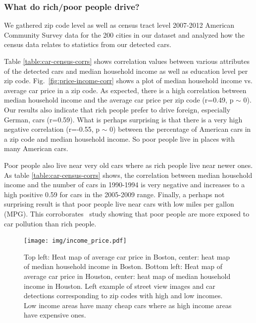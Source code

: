 \documentclass[10pt,twocolumn,letterpaper]{article}
\begin{document}
\subsubsection{What do rich/poor people drive?}
We gathered zip code level as well as census tract level 2007-2012 American Community Survey data for the 200 cities in our dataset and analyzed how the census data relates to statistics from our detected cars. 

Table \ref{table:car-census-corrs} shows correlation values between various attributes of the detected cars and median household income as well as education level per zip code. Fig.~\ref{fig:price-income-corr} shows a plot of median household income vs. average car price in a zip code. As expected, there is a high correlation between median household income and the average car price per zip code (r=0.49, p \(\sim\) 0). Our results also indicate that rich people prefer to drive foreign, especially German, cars (r=0.59). What is perhaps surprising is that there is a very high negative correlation (r=-0.55, p \(\sim\) 0) between the percentage of American cars in a zip code and median household income. So poor people live in places with many American cars.

Poor people also live near very old cars where as rich people live near newer ones. As table \ref{table:car-census-corrs} shows, the correlation between median household income and the number of cars in 1990-1994 is very negative and increases to a high positive 0.59 for cars in the 2005-2009 range. Finally, a perhaps not surprising result is that poor people live near cars with low miles per gallon (MPG). This corroborates~\cite{cal-traffic-study} study showing that poor people are more exposed to car pollution than rich people.
 
\begin{figure}[t]
\begin{center}
    \texttt{[image: img/income\_price.pdf]}
\end{center}
   \caption {Top left: Heat map of average car price in Boston, center: heat map of median household income in Boston. Bottom left: Heat map of average car price in Houston, center: heat map of median household income in Houston. Left example of street view images and car detections corresponding to zip codes with high and low incomes. Low income areas have many cheap cars where as high income areas have expensive ones.}
\label{fig:bos-sf-vis}
\end{figure}
\end{document}
